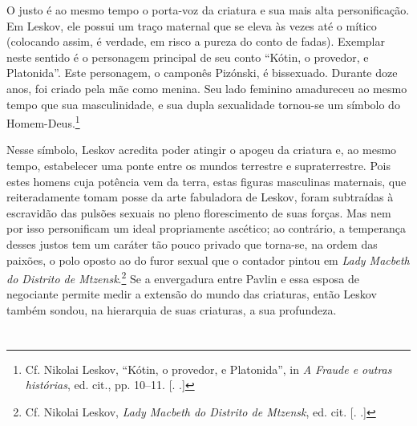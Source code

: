O justo é ao mesmo tempo o porta-voz da criatura e sua mais alta
personificação. Em Leskov, ele possui um traço maternal que se eleva às
vezes até o mítico (colocando assim, é verdade, em risco a pureza do
conto de fadas). Exemplar neste sentido é o personagem principal de seu
conto ``Kótin, o provedor, e Platonida''. Este personagem, o camponês
Pizónski, é bissexuado. Durante doze anos, foi criado pela mãe como
menina. Seu lado feminino amadureceu ao mesmo tempo que sua
masculinidade, e sua dupla sexualidade tornou-se um símbolo do
Homem-Deus.\footnote{Cf. Nikolai Leskov, ``Kótin, o provedor, e
  Platonida'', in \emph{A Fraude e outras histórias}, ed. cit., pp.
  10--11. [. .]}

Nesse símbolo, Leskov acredita poder atingir o apogeu da criatura e, ao
mesmo tempo, estabelecer uma ponte entre os mundos terrestre e
supraterrestre. Pois estes homens cuja potência vem da terra, estas
figuras masculinas maternais, que reiteradamente tomam posse da arte
fabuladora de Leskov, foram subtraídas à escravidão das pulsões sexuais
no pleno florescimento de suas forças. Mas nem por isso personificam um
ideal propriamente ascético; ao contrário, a temperança desses justos
tem um caráter tão pouco privado que torna-se, na ordem das paixões, o
polo oposto ao do furor sexual que o contador pintou em \emph{Lady
Macbeth do Distrito de Mtzensk}.\footnote{Cf. Nikolai Leskov, \emph{Lady
  Macbeth do Distrito de Mtzensk}, ed. cit. [. .]} Se a
envergadura entre Pavlin e essa esposa de negociante permite medir a
extensão do mundo das criaturas, então Leskov também sondou, na
hierarquia de suas criaturas, a sua profundeza.

\section{}

